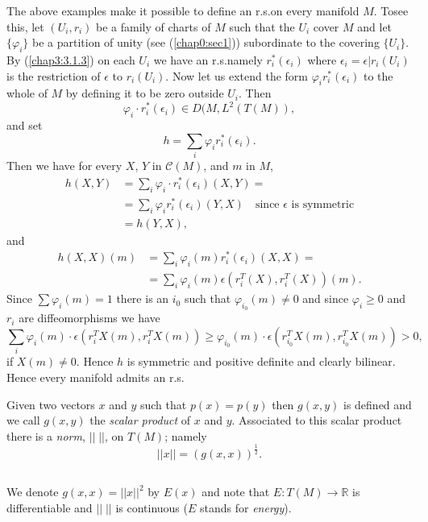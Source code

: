 The above examples make it possible to define an r.s.\@ on every
manifold $M$. To\pageoriginale see this, let $(U_{i},r_{i})$ be a
family of charts of $M$ such that the $U_{i}$ cover $M$ and let
$\{\varphi_{i}\}$ be a partition of unity (see (\ref{chap0:sec1}))
subordinate to the covering $\{U_{i}\}$. By (\ref{chap3:3.1.3}) on
each $U_{i}$ we have an r.s.\@ namely $r^{\ast}_{i}(\epsilon_{i})$ where
$\epsilon_{i}=\epsilon|r_{i}(U_{i})$ is the restriction of $\epsilon$
to $r_{i}(U_{i})$. Now let us extend the form
$\varphi_{i}r^{\ast}_{i}(\epsilon_{i})$ to the whole of $M$ by
defining it to be zero outside $U_{i}$. Then
$$
\varphi_{i}\cdot r^{\ast}_{i}(\epsilon_{i})\in D(M,L^{2}(T(M)),
$$
and set
$$
h=\sum_{i}\varphi_{i}r^{\ast}_{i}(\epsilon_{i}).
$$
Then we have for every $X$, $Y$ in $\mathscr{C}(M)$, and $m$ in $M$,
\begin{align*}
h(X,Y) &= \sum_{i}\varphi_{i}\cdot r^{\ast}_{i}(\epsilon_{i})(X,Y)=\\
&= \sum_{i}\varphi_{i}r^{\ast}_{i}(\epsilon_{i})(Y,X)\quad\text{since
  $\epsilon$ is symmetric}\\
&= h(Y,X),
\end{align*}
and
\begin{align*}
h(X,X)(m) &= \sum_{i}\varphi_{i}(m)r^{\ast}_{i}(\epsilon_{i})(X,X)=\\
&= \sum_{i}\varphi_{i}(m)\epsilon(r^{T}_{i}(X),r^{T}_{i}(X))(m).
\end{align*}
Since $\sum \varphi_{i}(m)=1$ there is an $i_{0}$ such that
$\varphi_{i_{0}}(m)\neq 0$ and since $\varphi_{i}\geq 0$ and $r_{i}$
are diffeomorphisms we have
$$
\sum_{i}\varphi_{i}(m)\cdot \epsilon(r^{T}_{i}X(m),r^{T}_{i}X(m))\geq
\varphi_{i_{0}}(m)\cdot \epsilon(r^{T}_{i_{0}}X(m),r^{T}_{i_{0}}X(m))>0,
$$
if $X(m)\neq 0$. Hence \pageoriginale $h$ is symmetric and positive
definite and clearly bilinear. Hence every manifold admits an r.s.

Given two vectors $x$ and $y$ such that $p(x)=p(y)$ then $g(x,y)$ is
defined and we call $g(x,y)$ the {\em scalar product} of $x$ and
$y$. Associated to this scalar product there is a {\em norm},
$||\;||$, on $T(M)$; namely
\begin{equation*}
||x||=(g(x,x))^{\frac{1}{2}}.\tag{3.1.5}\label{chap3:3.1.5}
\end{equation*}

\setcounter{subsection}{5}
\subsection{}\label{chap3:3.1.6}
We denote $g(x,x)=||x||^{2}$ by $E(x)$ and note that $E:T(M)\to
\mathbb{R}$ is differentiable and $||\;||$ is continuous ($E$ stands 
for {\em energy}).


